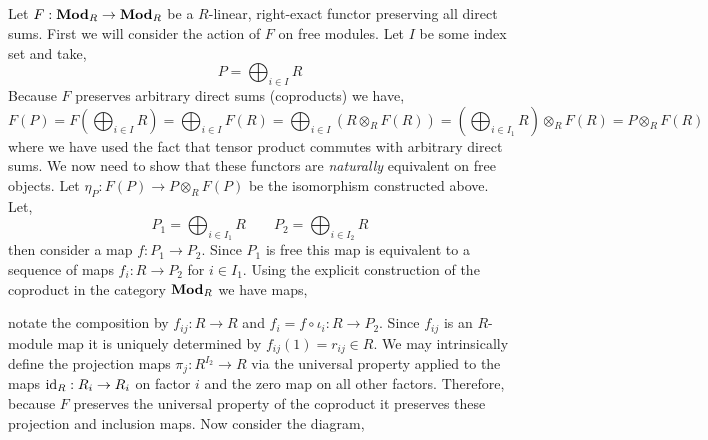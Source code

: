 \documentclass[12pt]{article}
\begin{document}
\subsection{}

Let $F : \mathbf{Mod}_{R} \to \mathbf{Mod}_{R}$ be a $R$-linear, right-exact functor preserving all direct sums. First we will consider the action of $F$ on free modules. Let $I$ be some index set and take,
\[ P = \bigoplus_{i \in I} R \]
Because $F$ preserves arbitrary direct sums (coproducts) we have,
\[ F(P) = F\left( \bigoplus_{i \in I} R  \right) = \bigoplus_{i \in I} F(R) = \bigoplus_{i \in I} (R \otimes_R F(R)) = \left( \bigoplus_{i \in I_1} R \right) \otimes_R F(R) = P \otimes_R F(R) \]
where we have used the fact that tensor product commutes with arbitrary direct sums. We now need to show that these functors are \textit{naturally} equivalent on free objects. Let $\eta_P : F(P) \to P \otimes_R F(P)$ be the isomorphism constructed above. Let,
\[ P_1 = \bigoplus_{i \in I_1} R \quad \quad P_2 = \bigoplus_{i \in I_2} R \]
then consider a map $f : P_1 \to P_2$. Since $P_1$ is free this map is equivalent to a sequence of maps $f_i : R \to P_2$ for $i \in I_1$. Using the explicit construction of the coproduct in the category $\mathbf{Mod}_{R}$ we have maps,
\begin{center}
\end{center}
notate the composition by $f_{ij} : R \to R$ and $f_i = f \circ \iota_i : R \to P_2$. Since $f_{ij}$ is an $R$-module map it is uniquely determined by $f_{ij}(1) = r_{ij} \in R$. We may intrinsically define the projection maps $\pi_j : R^{I_2} \to R$ via the universal property applied to the maps $\mathrm{id}_R : R_i \to R_i$ on factor $i$ and the zero map on all other factors. Therefore, because $F$ preserves the universal property of the coproduct it preserves these projection and inclusion maps. 
Now consider the diagram,
\begin{center}
\end{center}   
\end{document}
